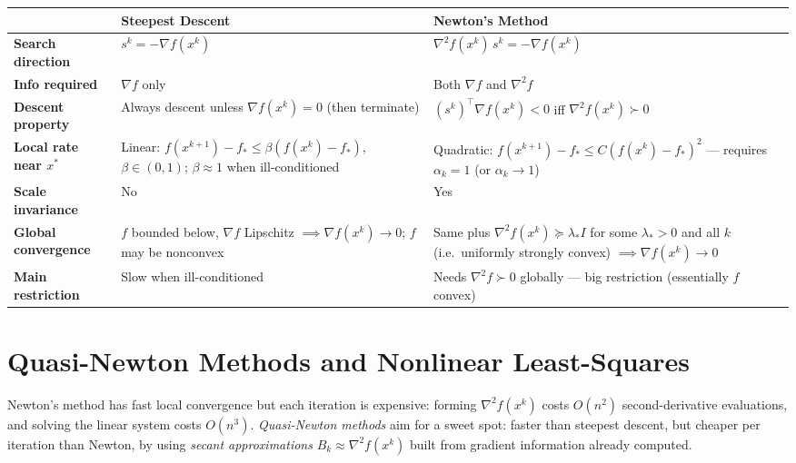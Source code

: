 \documentclass[11pt,a4paper]{report}
\theoremstyle{plain}
\theoremstyle{definition}
\newcommand{\grad}{\nabla}
\newcommand{\hess}{\nabla^{2}}
\newcommand{\trans}{^{\top}}
\begin{document}
\begin{table}[h]
  \centering
  \renewcommand{\arraystretch}{1.4}
  \begin{tabularx}{\textwidth}{@{}l X X@{}}
   & \textbf{Steepest Descent} & \textbf{Newton's Method} \\
  \midrule
  \textbf{Search direction}
    & $s^k = -\grad f(x^k)$
    & $\grad^2 f(x^k)\, s^k = -\grad f(x^k)$ \\
  \midrule
  \textbf{Info required}
    & $\grad f$ only
    & Both $\grad f$ and $\grad^2 f$ \\
  \midrule
  \textbf{Descent property}
    & Always descent unless $\grad f(x^k) = 0$ (then terminate)
    & $(s^k)\trans \grad f(x^k) < 0$ iff $\grad^2 f(x^k) \succ 0$ \\
  \midrule
  \textbf{Local rate near $x^*$}
    & Linear: $f(x^{k+1})-f_* \le \beta(f(x^k)-f_*)$, $\beta \in (0,1)$; $\beta \approx 1$ when ill-conditioned
    & Quadratic: $f(x^{k+1})-f_* \le C(f(x^k)-f_*)^2$ --- requires $\alpha_k = 1$ (or $\alpha_k \to 1$) \\
  \midrule
  \textbf{Scale invariance}
    & No
    & Yes \\
  \midrule
  \textbf{Global convergence}
    & $f$ bounded below, $\grad f$ Lipschitz $\implies \grad f(x^k) \to 0$; $f$ may be nonconvex
    & Same plus $\grad^2 f(x^k) \succeq \lambda_* I$ for some $\lambda_* > 0$ and all $k$ (i.e.\ uniformly strongly convex) $\implies \grad f(x^k) \to 0$ \\
  \midrule
  \textbf{Main restriction}
    & Slow when ill-conditioned
    & Needs $\grad^2 f \succ 0$ globally --- big restriction (essentially $f$ convex) \\
  \bottomrule
  \end{tabularx}
  \label{tab:sd-vs-newton}
  \end{table}


\chapter{Quasi-Newton Methods and Nonlinear Least-Squares}
\label{ch:qn-nls}

Newton's method has fast local convergence but each iteration is expensive: forming
$\hess f(x^{k})$ costs $O(n^{2})$ second-derivative evaluations, and solving the
linear system costs $O(n^{3})$. \emph{Quasi-Newton methods} aim for a sweet spot:
faster than steepest descent, but cheaper per iteration than Newton, by using
\emph{secant approximations} $B_{k}\approx\hess f(x^{k})$ built from gradient
information already computed.
\end{document}
